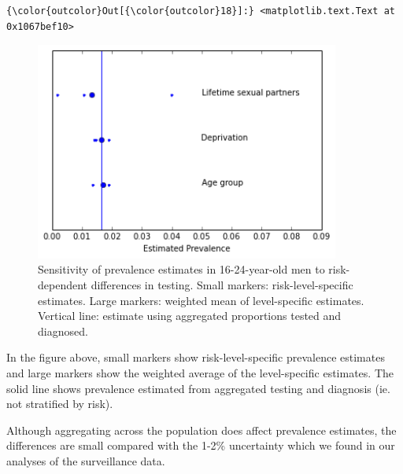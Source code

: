 \documentclass{article}
\begin{document}
    \begin{footnotesize}
            \begin{Verbatim}[commandchars=\\\{\}]
{\color{outcolor}Out[{\color{outcolor}18}]:} <matplotlib.text.Text at 0x1067bef10>
\end{Verbatim}
    \end{footnotesize}
        
    \begin{figure}
        \begin{center}\includegraphics[width=10cm]{three_compartment_model_files/three_compartment_model_25_1.png}\end{center}
        \caption{Sensitivity of prevalence estimates in 16-24-year-old men to risk-dependent differences in testing. Small markers: risk-level-specific estimates. Large markers: weighted mean of level-specific estimates. Vertical line: estimate using aggregated proportions tested and diagnosed.}
        \label{}
    \end{figure}
    
    In the figure above, small markers show risk-level-specific prevalence
estimates and large markers show the weighted average of the
level-specific estimates. The solid line shows prevalence estimated from
aggregated testing and diagnosis (ie. not stratified by risk).

Although aggregating across the population does affect prevalence
estimates, the differences are small compared with the 1-2\% uncertainty
which we found in our analyses of the surveillance data.


    
    
    
    
\end{document}

